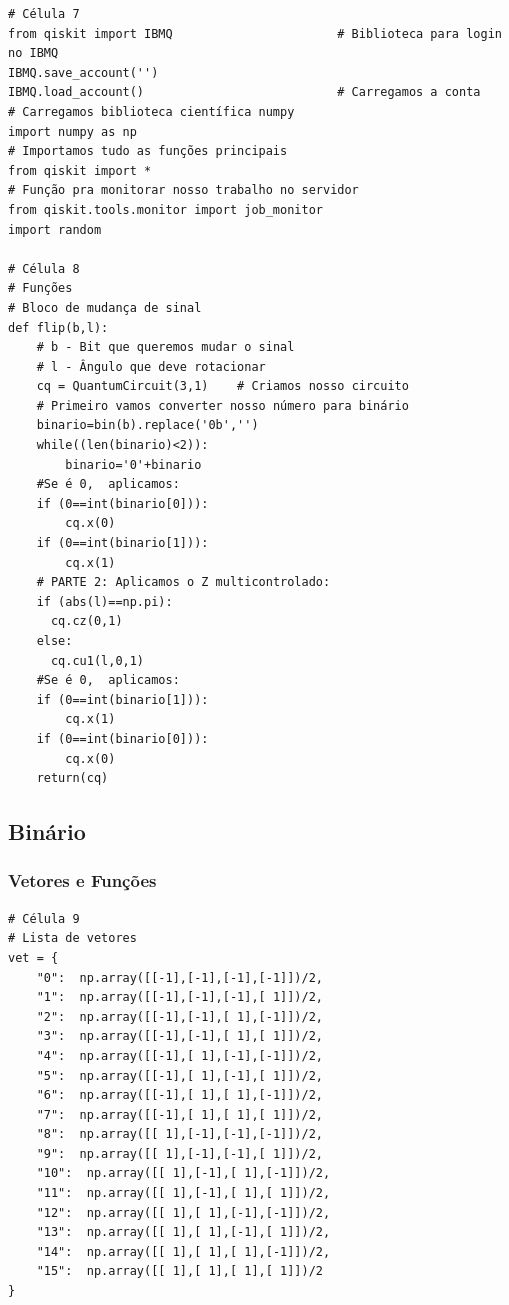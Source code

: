 \begin{verbatim}
# Célula 7
from qiskit import IBMQ                       # Biblioteca para login no IBMQ
IBMQ.save_account('')
IBMQ.load_account()                           # Carregamos a conta
# Carregamos biblioteca científica numpy
import numpy as np                       
# Importamos tudo as funções principais
from qiskit import *                          
# Função pra monitorar nosso trabalho no servidor
from qiskit.tools.monitor import job_monitor  
import random

# Célula 8
# Funções
# Bloco de mudança de sinal
def flip(b,l):
    # b - Bit que queremos mudar o sinal
    # l - Ângulo que deve rotacionar
    cq = QuantumCircuit(3,1)    # Criamos nosso circuito 
    # Primeiro vamos converter nosso número para binário
    binario=bin(b).replace('0b','')
    while((len(binario)<2)):
        binario='0'+binario
    #Se é 0,  aplicamos:
    if (0==int(binario[0])):
        cq.x(0)
    if (0==int(binario[1])):
        cq.x(1)
    # PARTE 2: Aplicamos o Z multicontrolado:
    if (abs(l)==np.pi):
      cq.cz(0,1)
    else:
      cq.cu1(l,0,1)
    #Se é 0,  aplicamos:
    if (0==int(binario[1])):
        cq.x(1)
    if (0==int(binario[0])):
        cq.x(0)
    return(cq)
\end{verbatim}
\subsection{Binário}
\subsubsection{Vetores e Funções}

\begin{verbatim}
# Célula 9
# Lista de vetores
vet = {
    "0":  np.array([[-1],[-1],[-1],[-1]])/2,
    "1":  np.array([[-1],[-1],[-1],[ 1]])/2,
    "2":  np.array([[-1],[-1],[ 1],[-1]])/2,
    "3":  np.array([[-1],[-1],[ 1],[ 1]])/2,
    "4":  np.array([[-1],[ 1],[-1],[-1]])/2,
    "5":  np.array([[-1],[ 1],[-1],[ 1]])/2,
    "6":  np.array([[-1],[ 1],[ 1],[-1]])/2,
    "7":  np.array([[-1],[ 1],[ 1],[ 1]])/2,
    "8":  np.array([[ 1],[-1],[-1],[-1]])/2,
    "9":  np.array([[ 1],[-1],[-1],[ 1]])/2,
    "10":  np.array([[ 1],[-1],[ 1],[-1]])/2,
    "11":  np.array([[ 1],[-1],[ 1],[ 1]])/2,
    "12":  np.array([[ 1],[ 1],[-1],[-1]])/2,
    "13":  np.array([[ 1],[ 1],[-1],[ 1]])/2,
    "14":  np.array([[ 1],[ 1],[ 1],[-1]])/2,
    "15":  np.array([[ 1],[ 1],[ 1],[ 1]])/2
}
\end{verbatim}

